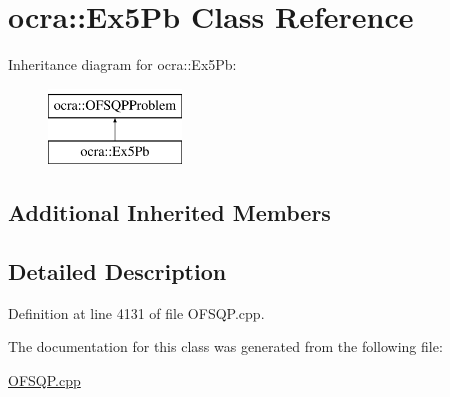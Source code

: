 \hypertarget{classocra_1_1Ex5Pb}{}\section{ocra\+:\+:Ex5\+Pb Class Reference}
\label{classocra_1_1Ex5Pb}
Inheritance diagram for ocra\+:\+:Ex5\+Pb\+:\begin{figure}[H]
\begin{center}
\leavevmode
\includegraphics[height=2.000000cm]{dd/ddf/classocra_1_1Ex5Pb}
\end{center}
\end{figure}
\subsection*{Additional Inherited Members}


\subsection{Detailed Description}


Definition at line 4131 of file O\+F\+S\+Q\+P.\+cpp.



The documentation for this class was generated from the following file\+:\begin{DoxyCompactItemize}
\item 
\hyperlink{OFSQP_8cpp}{O\+F\+S\+Q\+P.\+cpp}\end{DoxyCompactItemize}
